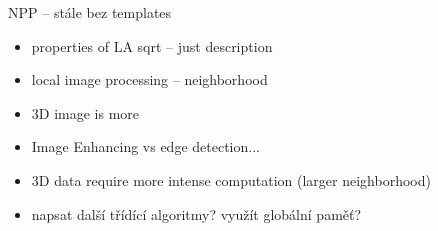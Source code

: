 \documentclass[oneside]{article}
\newcommand{\beI}{\begin{itemize}}
\newcommand{\enI}{\end{itemize}}
\begin{document}
NPP -- stále bez templates

\beI
    \item properties of LA sqrt -- just description
    \item local image processing -- neighborhood
    \item 3D image is more
\enI

\begin{itemize}
    \item Image Enhancing vs edge detection...
    \item 3D data require more intense computation (larger neighborhood)
    \item napsat další třídící algoritmy? využít globální paměť?
\end{itemize}
\end{document}
